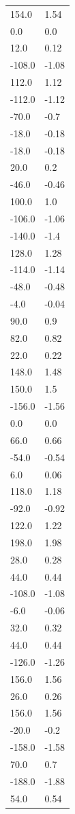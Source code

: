 \begin{longtable}{ll}
154.0 & 1.54 \\
0.0 & 0.0 \\
12.0 & 0.12 \\
-108.0 & -1.08 \\
112.0 & 1.12 \\
-112.0 & -1.12 \\
-70.0 & -0.7 \\
-18.0 & -0.18 \\
-18.0 & -0.18 \\
20.0 & 0.2 \\
-46.0 & -0.46 \\
100.0 & 1.0 \\
-106.0 & -1.06 \\
-140.0 & -1.4 \\
128.0 & 1.28 \\
-114.0 & -1.14 \\
-48.0 & -0.48 \\
-4.0 & -0.04 \\
90.0 & 0.9 \\
82.0 & 0.82 \\
22.0 & 0.22 \\
148.0 & 1.48 \\
150.0 & 1.5 \\
-156.0 & -1.56 \\
0.0 & 0.0 \\
66.0 & 0.66 \\
-54.0 & -0.54 \\
6.0 & 0.06 \\
118.0 & 1.18 \\
-92.0 & -0.92 \\
122.0 & 1.22 \\
198.0 & 1.98 \\
28.0 & 0.28 \\
44.0 & 0.44 \\
-108.0 & -1.08 \\
-6.0 & -0.06 \\
32.0 & 0.32 \\
44.0 & 0.44 \\
-126.0 & -1.26 \\
156.0 & 1.56 \\
26.0 & 0.26 \\
156.0 & 1.56 \\
-20.0 & -0.2 \\
-158.0 & -1.58 \\
70.0 & 0.7 \\
-188.0 & -1.88 \\
54.0 & 0.54 \\

\end{longtable}
